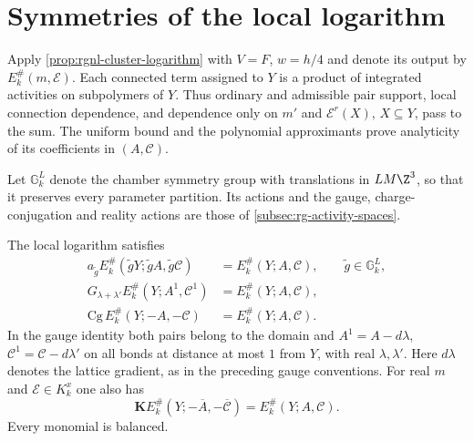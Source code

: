 \section{Symmetries of the local logarithm}
\label{subsec:rgnl-symmetries}

Apply \cref{prop:rgnl-cluster-logarithm} with
$V=F$, $w=h/4$ and denote its output by
$E_k^\#(m,\mathscr E)$. Each connected term assigned to
$Y$ is a product of integrated activities on subpolymers
of $Y$. Thus ordinary and admissible pair support, local
connection dependence, and dependence only on $m'$ and
$\mathscr E^r(X)$, $X\subseteq Y$, pass to the sum.
The uniform bound and the polynomial approximants prove
analyticity of its coefficients in $(A,\mathscr C)$.

Let $\mathbb G_k^L$ denote the chamber symmetry group with
translations in $LM\Z^3$, so that it preserves every
parameter partition. Its actions and the gauge,
charge-conjugation and reality actions are those of
\cref{subsec:rg-activity-spaces}.

\begin{proposition}\label{prop:rgnl-symmetries}
The local logarithm satisfies
\begin{align}
 a_{\tilde g}E_k^\#(\tilde gY;\tilde gA,\tilde g\mathscr C)
          &=E_k^\#(Y;A,\mathscr C),\qquad \tilde g\in\mathbb G_k^L,
                                      \label{eq:rgnl-lattice-symmetry}\\
 G_{\lambda+\lambda'}E_k^\#(Y;A^1,\mathscr C^1)
          &=E_k^\#(Y;A,\mathscr C),    \label{eq:rgnl-gauge-symmetry}\\
 \mathrm{Cg}\,E_k^\#(Y;-A,-\mathscr C)
          &=E_k^\#(Y;A,\mathscr C).    \label{eq:rgnl-charge-symmetry}
\end{align}
In the gauge identity both pairs belong to the domain and
 $A^1=A-d\lambda$, $\mathscr C^1=\mathscr C-d\lambda'$
on all bonds at distance at most $1$ from $Y$, with
real $\lambda,\lambda'$. Here $d\lambda$ denotes the
lattice gradient, as in the preceding gauge conventions.
For real $m$ and $\mathscr E\in K_k^x$ one also has
\begin{equation}\label{eq:rgnl-reality-symmetry}
 \mathbf K E_k^\#(Y;-\overline A,-\overline{\mathscr C})
                                        =E_k^\#(Y;A,\mathscr C).
\end{equation}
Every monomial is balanced.
\end{proposition}


